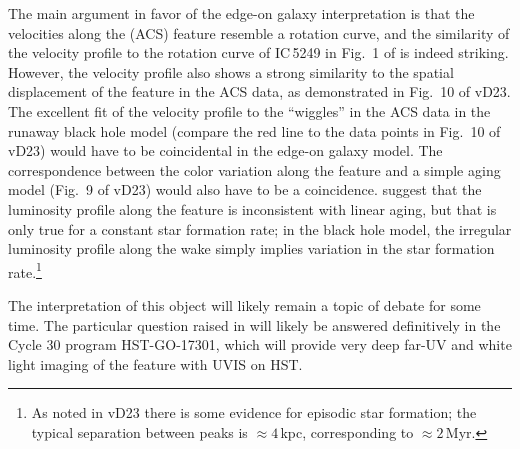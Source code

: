 \documentclass[RNAAS]{aastex62}
\begin{document}
The main argument in favor of the edge-on galaxy interpretation is that the velocities
along the (ACS) feature resemble a rotation curve, and the similarity of the velocity
profile to the rotation curve of IC\,5249 in Fig.\ 1 of \citet{s23} is indeed striking.
However, the velocity profile also shows a strong similarity to the
spatial displacement of the feature in the ACS data, as demonstrated in Fig.\ 10
of vD23. The excellent fit of the velocity profile to the ``wiggles'' in the ACS
data in the runaway black hole model (compare the red line to the data points in
Fig.\ 10 of vD23) would have to be coincidental in the edge-on galaxy model.
The correspondence between the color variation along the feature  and a simple
aging model (Fig.\ 9 of vD23) would also have to be a coincidence. \citet{s23}
suggest that the luminosity profile along the feature is inconsistent with linear aging, but
that is only true for a constant star formation rate;
in the black hole model,
the irregular luminosity profile
along the wake simply implies variation in the star formation rate.\footnote{As noted in vD23 there is some evidence for
episodic star formation; the typical separation between peaks is $\approx 4$\,kpc,
corresponding to $\approx 2$\,Myr.}

The interpretation of this object will likely remain a topic of debate for some time. The particular question
raised in \citet{s23} will likely be answered definitively in the Cycle 30 program
HST-GO-17301, which will provide very deep far-UV and white light imaging of the feature with UVIS on HST.








\end{document}
